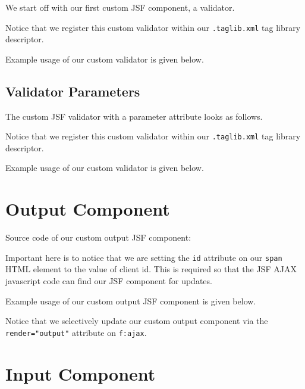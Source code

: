 We start off with our first custom JSF component, a validator.


Notice that we register this custom validator within our \texttt{.taglib.xml} tag library descriptor.

Example usage of our custom validator is given below.


\subsection{Validator Parameters}

The custom JSF  validator with a parameter attribute looks as follows.


Notice that we register this custom validator within our \texttt{.taglib.xml} tag library descriptor.

Example usage of our custom validator is given below.


\section{Output Component}

Source code of our custom output JSF component:


Important here is to notice that we are setting the \texttt{id} attribute on our \texttt{span} HTML element to the value of client id.
This is required so that the JSF AJAX javascript code can find our JSF component for updates.

Example usage of our custom output JSF component is given below.


Notice that we selectively update our custom output component via the \texttt{render="output"} attribute on \texttt{f:ajax}.

\section{Input Component}

